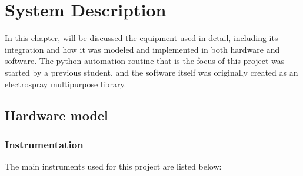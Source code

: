 \chapter{System Description}
\label{chap:system_description}

In this chapter, will be discussed the equipment used in detail, including its integration and how it was modeled and implemented in both hardware and software. 
The python automation routine that is the focus of this project was started by a previous student\cite{Monica}, and the software itself was originally created as an electrospray multipurpose library.

\section{Hardware model}
\label{sec:hardware_model}

\subsection{Instrumentation}
\label{subsec:instrumentation}

The main instruments used for this project are listed below:


